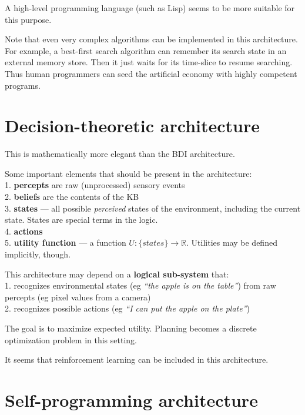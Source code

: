 \documentclass[a4paper]{report}
\begin{document}
A high-level programming language (such as Lisp) seems to be more suitable for this purpose.

Note that even very complex algorithms can be implemented in this architecture.  For example, a best-first search algorithm can remember its search state in an external memory store.  Then it just waits for its time-slice to resume searching.  Thus human programmers can seed the artificial economy with highly competent programs.

\section{Decision-theoretic architecture}

This is mathematically more elegant than the BDI architecture.

Some important elements that should be present in the architecture:\\
1.  \textbf{percepts} are raw (unprocessed) sensory events\\
2.  \textbf{beliefs} are the contents of the KB\\
3.  \textbf{states} --- all possible \textit{perceived} states of the environment, including the current state.  States are special terms in the logic.\\
4.  \textbf{actions}\\
5.  \textbf{utility function} --- a function $U: \{states\} \rightarrow \mathbb{R}$.  Utilities may be defined implicitly, though.

This architecture may depend on a \textbf{logical sub-system} that:\\
1.  recognizes environmental states (eg \textit{``the apple is on the table''}) from raw percepts (eg pixel values from a camera)\\
2.  recognizes possible actions (eg \textit{``I can put the apple on the plate''})

The goal is to maximize expected utility.  Planning becomes a discrete optimization problem in this setting.

It seems that reinforcement learning  can be included in this architecture.

\section{Self-programming architecture}
\label{sec:self-programming-architecture}
\end{document}
